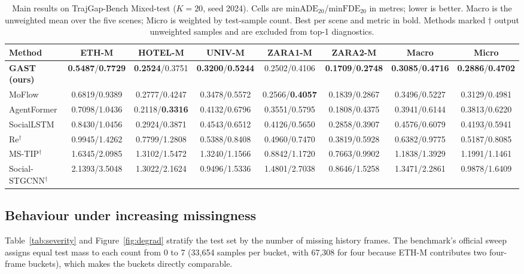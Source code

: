 \begin{table}[t]
\centering
\footnotesize
\setlength{\tabcolsep}{3.2pt}
\caption{Main results on TrajGap-Bench Mixed-test ($K=20$, seed 2024). Cells are $\mathrm{minADE}_{20}$/$\mathrm{minFDE}_{20}$ in metres; lower is better. Macro is the unweighted mean over the five scenes; Micro is weighted by test-sample count. Best per scene and metric in bold. Methods marked $\dagger$ output unweighted samples and are excluded from top-1 diagnostics.}
\label{tab:main}
\begin{tabular}{@{}lccccccc@{}}
\toprule
Method & ETH-M & HOTEL-M & UNIV-M & ZARA1-M & ZARA2-M & Macro & Micro \\
\midrule
\textbf{GAST (ours)} & \textbf{0.5487}/\textbf{0.7729} & \textbf{0.2524}/0.3751 & \textbf{0.3200}/\textbf{0.5244} & 0.2502/0.4106 & \textbf{0.1709}/\textbf{0.2748} & \textbf{0.3085}/\textbf{0.4716} & \textbf{0.2886}/\textbf{0.4702} \\
MoFlow & 0.6819/0.9389 & 0.2777/0.4247 & 0.3478/0.5572 & 0.2566/\textbf{0.4057} & 0.1839/0.2867 & 0.3496/0.5227 & 0.3129/0.4981 \\
AgentFormer & 0.7098/1.0436 & 0.2118/\textbf{0.3316} & 0.4132/0.6796 & 0.3551/0.5795 & 0.1808/0.4375 & 0.3941/0.6144 & 0.3813/0.6220 \\
SocialLSTM & 0.8430/1.0456 & 0.2924/0.3871 & 0.4543/0.6512 & 0.4126/0.5650 & 0.2858/0.3907 & 0.4576/0.6079 & 0.4193/0.5941 \\
Re$^{\dagger}$ & 0.9945/1.4262 & 0.7799/1.2808 & 0.5388/0.8408 & 0.4960/0.7470 & 0.3819/0.5928 & 0.6382/0.9775 & 0.5187/0.8085 \\
MS-TIP$^{\dagger}$ & 1.6345/2.0985 & 1.3102/1.5472 & 1.3240/1.1566 & 0.8842/1.1720 & 0.7663/0.9902 & 1.1838/1.3929 & 1.1991/1.1461 \\
Social-STGCNN$^{\dagger}$ & 2.1393/3.5048 & 1.3022/2.1624 & 0.9496/1.5336 & 1.4801/2.7038 & 0.8646/1.5258 & 1.3471/2.2861 & 0.9878/1.6409 \\
\bottomrule
\end{tabular}
\end{table}

\subsection{Behaviour under increasing missingness}
\label{sec:severity}

Table~\ref{tab:severity} and Figure~\ref{fig:degrad} stratify the test set by the number of missing history frames. The benchmark's official sweep assigns equal test mass to each count from 0 to 7 (33{,}654 samples per bucket, with 67{,}308 for four because ETH-M contributes two four-frame buckets), which makes the buckets directly comparable.

